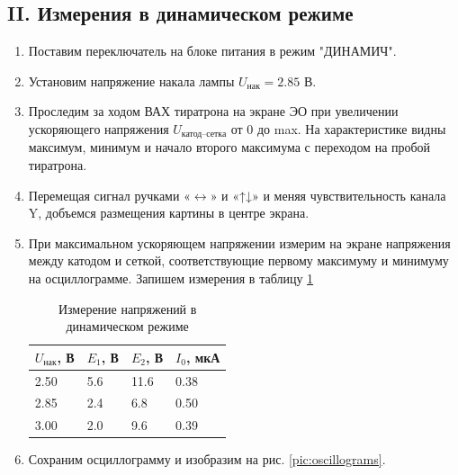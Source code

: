 \documentclass[a4paper,12pt]{article}
\begin{document}
\subsection*{II. Измерения в динамическом режиме}

\begin{enumerate}
    \item Поставим переключатель на блоке питания в режим "ДИНАМИЧ".
    \item Установим напряжение накала лампы $U_\text{нак} = 2.85$ В.
    \item Проследим за ходом ВАХ тиратрона на экране ЭО при увеличении ускоряющего напряжения $U_{\text{катод–сетка}}$ от 0 до max. На характеристике видны максимум, минимум и начало второго максимума с переходом на пробой тиратрона.
    \item Перемещая сигнал ручками «$\leftrightarrow$» и «↑↓» и меняя чувствительность канала Y, добъемся размещения картины в центре экрана.
    \item При максимальном ускоряющем напряжении измерим на экране напряжения между катодом и сеткой, соответствующие первому максимуму и минимуму на осциллограмме. Запишем измерения в таблицу \ref{table:dynamic_Es}

\begin{table}[h]
    \centering
    \begin{tabular}{l|lll}
        \hline
        $U_{\text{нак}}$, В & $E_1$, В & $E_2$, В & $I_0$, мкА \\ \hline
        2.50             & 5.6      & 11.6     & 0.38       \\ 
        2.85             & 2.4      & 6.8      & 0.50       \\
        3.00             & 2.0      & 9.6      & 0.39       \\ \hline
    \end{tabular}
    \caption{Измерение напряжений в динамическом режиме}
    \label{table:dynamic_Es}
\end{table}


    \item Сохраним осциллограмму и изобразим на рис. \ref{pic:oscillograms}.

\begin{figure}[h!]
    \centering


\end{figure}
\end{enumerate}
\end{document}
